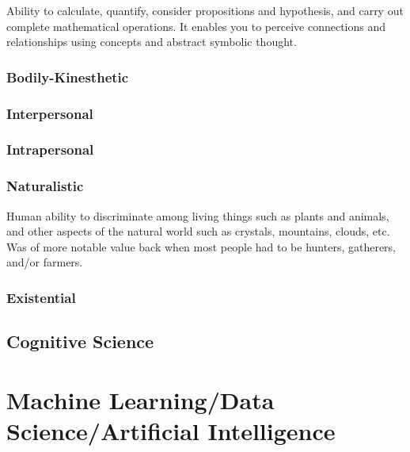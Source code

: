 \documentclass{article}
\begin{document}
Ability to calculate, quantify, consider propositions and hypothesis, and carry out complete mathematical operations. It enables you to perceive connections and relationships using concepts and abstract symbolic thought.

\newpage 

\subsubsection{Bodily-Kinesthetic}

\newpage 

\subsubsection{Interpersonal}

\newpage 

\subsubsection{Intrapersonal}

\newpage 

\subsubsection{Naturalistic}

Human ability to discriminate among living things such as plants and animals, and other aspects of the natural world such as crystals, mountains, clouds, etc. Was of more notable value back when most people had to be hunters, gatherers, and/or farmers. 

\newpage 

\subsubsection{Existential}

\newpage 

\newpage 




\subsection{Cognitive Science}





\newpage 

\section{Machine Learning/Data Science/Artificial Intelligence}
\end{document}
